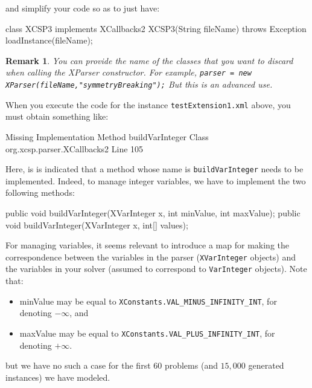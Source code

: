 \documentclass[10pt]{article}
\newenvironment{boxabsc}
               {\medskip \begin{bclogo}[barre=none,arrondi=0.2,logo=]{}\vspace{-0.6cm}}
               {\vspace{-0.1cm}\end{bclogo} \smallskip}
\newtheorem{remark}{Remark}
\newcommand{\nn}[1]{{\tt #1}} %
\begin{document}
and simplify your code so as to just have:

\begin{boxabsc}
\begin{absc}
class XCSP3 implements XCallbacks2 { 
  XCSP3(String fileName) throws Exception {
    loadInstance(fileName); 
  }
}  
\end{absc} 
\end{boxabsc}

\begin{remark}
You can provide the name of the classes that you want to discard when calling the XParser constructor. For example, \verb!parser = new XParser(fileName,"symmetryBreaking");! But this is an advanced use.
\end{remark}

When you execute the code for the instance \nn{testExtension1.xml} above, you must obtain something like:

\begin{boxabsc}
\begin{absc}
Missing Implementation
  Method buildVarInteger
  Class org.xcsp.parser.XCallbacks2
  Line 105
\end{absc} 
\end{boxabsc}	

Here, is is indicated that a method whose name is \nn{buildVarInteger} needs to be implemented.
Indeed, to manage integer variables, we have to implement the two following methods:

\begin{boxabsc}
\begin{absc}
 public void buildVarInteger(XVarInteger x, int minValue, int maxValue);
 public void buildVarInteger(XVarInteger x, int[] values);
\end{absc} 
\end{boxabsc}

For managing variables, it seems relevant to introduce a map for making the correspondence between the variables in the parser (\nn{XVarInteger} objects) and the variables in your solver (assumed to correspond to \nn{VarInteger} objects).
Note that:
\begin{itemize}
\item  minValue may be equal to \nn{XConstants.VAL\_MINUS\_INFINITY\_INT}, for denoting $- \infty$, and 
\item maxValue  may be equal to \nn{XConstants.VAL\_PLUS\_INFINITY\_INT}, for denoting $+ \infty$.
\end{itemize}
but we have no such a case for the first 60 problems (and $15,000$ generated instances) we have modeled.
\end{document}
